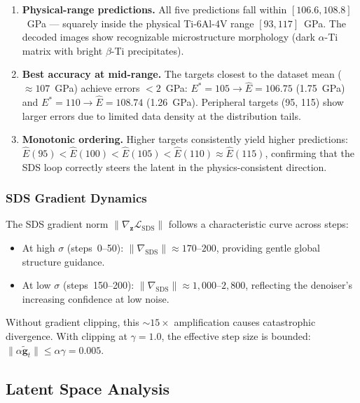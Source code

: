 \documentclass[12pt,a4paper]{article}
\newcommand{\loss}{\mathcal{L}}
\newcommand{\zvec}{\bm{z}}
\theoremstyle{definition}
\begin{document}
\begin{enumerate}[nosep]
  \item \textbf{Physical-range predictions.}  All five predictions fall
    within $[106.6, 108.8]$~GPa --- squarely inside the physical
    Ti-6Al-4V range $[93, 117]$~GPa.  The decoded images show
    recognizable microstructure morphology (dark $\alpha$-Ti matrix with
    bright $\beta$-Ti precipitates).

  \item \textbf{Best accuracy at mid-range.}  The targets closest to the
    dataset mean ($\approx 107$~GPa) achieve errors $< 2$~GPa:
    $E^* = 105 \to \hat{E} = 106.75$ (1.75~GPa) and
    $E^* = 110 \to \hat{E} = 108.74$ (1.26~GPa).  Peripheral targets
    (95, 115) show larger errors due to limited data density at the
    distribution tails.

  \item \textbf{Monotonic ordering.}  Higher targets consistently yield
    higher predictions: $\hat{E}(95) < \hat{E}(100) < \hat{E}(105) <
    \hat{E}(110) \approx \hat{E}(115)$, confirming that the SDS loop
    correctly steers the latent in the physics-consistent direction.
\end{enumerate}

\subsubsection{SDS Gradient Dynamics}

The SDS gradient norm $\| \nabla_\zvec \loss_{\mathrm{SDS}} \|$ follows a
characteristic curve across steps:
\begin{itemize}[nosep]
  \item At high $\sigma$ (steps~0--50): $\| \nabla_{\mathrm{SDS}} \| \approx 170$--$200$, providing gentle global structure guidance.
  \item At low $\sigma$ (steps~150--200): $\| \nabla_{\mathrm{SDS}} \| \approx 1{,}000$--$2{,}800$, reflecting the denoiser's increasing confidence at low noise.
\end{itemize}
Without gradient clipping, this $\sim\!\!15\times$ amplification causes
catastrophic divergence.  With clipping at $\gamma=1.0$, the effective
step size is bounded: $\| \alpha \tilde{\bm{g}}_t \| \le \alpha \gamma = 0.005$.

\subsection{Latent Space Analysis}
\end{document}
